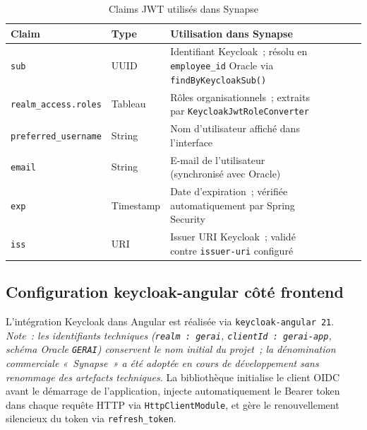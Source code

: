 \begin{table}[H]
\centering
\caption{Claims JWT utilisés dans Synapse}
\label{tab:jwt_claims}
\begin{tabularx}{\textwidth}{VlVlVLV}
\hline
\textbf{Claim} & \textbf{Type} & \textbf{Utilisation dans Synapse} \\
\hline
\texttt{sub} & UUID & Identifiant Keycloak~; résolu en \texttt{employee\_id} Oracle via \texttt{findByKeycloakSub()} \\
\hline
\texttt{realm\_access.roles} & Tableau & Rôles organisationnels~; extraits par \texttt{KeycloakJwtRoleConverter} \\
\hline
\texttt{preferred\_username} & String & Nom d'utilisateur affiché dans l’interface \\
\hline
\texttt{email} & String & E-mail de l’utilisateur (synchronisé avec Oracle) \\
\hline
\texttt{exp} & Timestamp & Date d’expiration~; vérifiée automatiquement par Spring Security \\
\hline
\texttt{iss} & URI & Issuer URI Keycloak~; validé contre \texttt{issuer-uri} configuré \\
\hline
\end{tabularx}
\end{table}

\subsection{Configuration keycloak-angular côté frontend}

L’intégration Keycloak dans Angular est réalisée via \texttt{keycloak-angular 21}.
\textit{Note~: les identifiants techniques (\texttt{realm~: gerai}, \texttt{clientId~: gerai-app},
schéma Oracle \texttt{GERAI}) conservent le nom initial du projet~; la dénomination
commerciale «~Synapse~» a été adoptée en cours de développement sans renommage des artefacts techniques.}
La bibliothèque initialise le client OIDC avant le démarrage de l’application,
injecte automatiquement le Bearer token dans chaque requête HTTP via
\texttt{HttpClientModule}, et gère le renouvellement silencieux du token via
\texttt{refresh\_token}.

